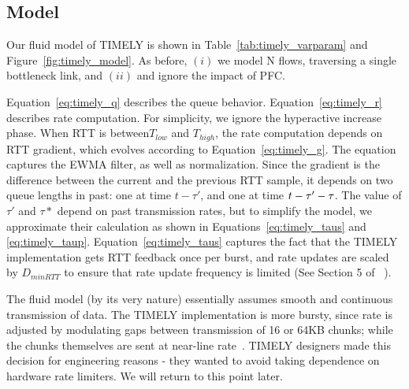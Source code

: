 \vspace{-0.7em}
\subsection{Model}

Our fluid model of TIMELY is shown in Table~\ref{tab:timely_varparam} and
Figure~\ref{fig:timely_model}. As before, $(i)$ we model N flows, traversing a
single bottleneck link, and $(ii)$ and ignore the impact of PFC. 

Equation~\ref{eq:timely_q} describes the queue behavior.
Equation~\ref{eq:timely_r} describes rate computation. For simplicity, we ignore
the hyperactive increase phase. When RTT is between$T_{low}$ and $T_{high}$, the
rate computation depends on RTT gradient, which evolves according to
Equation~\ref{eq:timely_g}.  The equation captures the EWMA filter, as well as
normalization. Since the gradient is the difference between the current and the
previous RTT sample, it depends on two queue lengths in past: one at time $t -
\tau'$, and one at time $t - \tau'-\tau\*$. The value of $\tau'$ and $\tau*$
depend on past transmission rates, but to simplify the model, we approximate
their calculation as shown in Equations~\ref{eq:timely_taus} and
\ref{eq:timely_taup}.  Equation~\ref{eq:timely_taus} captures the fact that the
TIMELY implementation gets RTT feedback once per burst, and rate updates are
scaled by $D_{minRTT}$ to ensure that rate update frequency is limited (See
Section 5 of ~\cite{timely}).

The fluid model (by its very nature) essentially assumes smooth and continuous
transmission of data. The TIMELY implementation is more bursty, since rate is
adjusted by modulating gaps between transmission of 16 or 64KB chunks; while the
chunks themselves are sent at near-line rate~\cite{timely}.  TIMELY
designers made this decision for engineering reasons - they wanted to avoid
taking dependence on hardware rate limiters.  We will return to this point
later.

